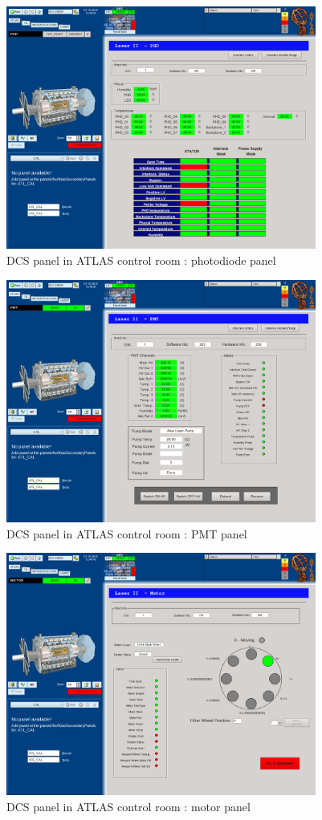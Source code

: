 \begin{appendices}
\begin{figure}[htbp]
\centering
\includegraphics[height=8cm]{figures/dcs_cr_phd.png}
\caption{DCS panel in ATLAS control room : photodiode panel}\label{fig:dcs_cr_b}
\end{figure}

\begin{figure}[htbp]
\centering
\includegraphics[height=8cm]{figures/dcs_cr_pmt.png}
\caption{DCS panel in ATLAS control room : PMT panel}\label{fig:dcs_cr_c}
\end{figure}

\begin{figure}[htbp]
\centering
\includegraphics[height=8cm]{figures/dcs_cr_motor.png}
\caption{DCS panel in ATLAS control room : motor panel}\label{fig:dcs_cr_d}
\end{figure}


\end{appendices}
